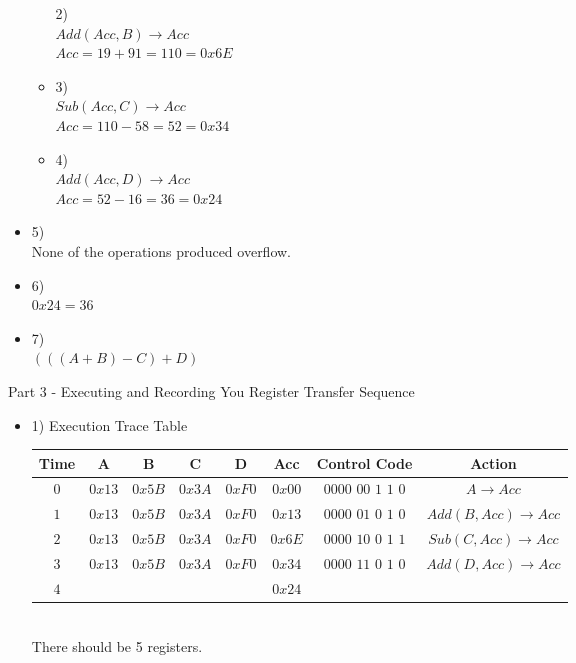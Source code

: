 \documentclass{article}
\begin{document}
\begin{itemize}
\begin{itemize}
      2)\\
      $Add(Acc, B)\to Acc$\\
      $Acc=19+91=110=0x6E$
    \item
      3)\\
      $Sub(Acc, C)\to Acc$\\
      $Acc=110-58=52=0x34$
    \item
      4)\\
      $Add(Acc, D)\to Acc$\\
      $Acc=52-16=36=0x24$
  \end{itemize}
  \item
    5)\\
    None of the operations produced overflow.
  \item
    6)\\
    $0x24=36$
  \item
    7)\\
    $(((A+B)-C)+D)$
\end{itemize}
	Part 3 - Executing and Recording You Register Transfer Sequence
\begin{itemize}
	\item
  1) Execution Trace Table\\

  \begin{tabular}{c|ccccc|c|c}
    Time & A       & B      & C      & D      & Acc    & Control Code & Action \\ \hline
    $0$  & $0x13$  & $0x5B$ & $0x3A$ & $0xF0$ & $0x00$ & $0000$ $00$ $1$  $1$  $0$ & $A\to Acc$ \\
    $1$  & $0x13$  & $0x5B$ & $0x3A$ & $0xF0$ & $0x13$ & $0000$ $01$ $0$  $1$  $0$ & $Add(B, Acc)\to Acc$ \\
    $2$  & $0x13$  & $0x5B$ & $0x3A$ & $0xF0$ & $0x6E$ & $0000$ $10$ $0$  $1$  $1$ & $Sub(C, Acc)\to Acc$ \\
    $3$  & $0x13$  & $0x5B$ & $0x3A$ & $0xF0$ & $0x34$ & $0000$ $11$ $0$  $1$  $0$ & $Add(D, Acc)\to Acc$ \\
    $4$  &         &        &        &        & $0x24$ &                           &                      \\
  \end{tabular}\\

  There should be 5 registers.
\end{itemize}
\end{document}
